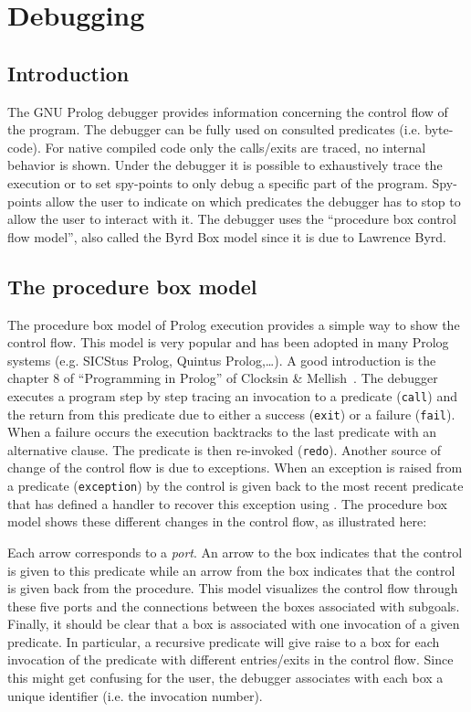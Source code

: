 \newpage
\section{Debugging}
\label{Debugging}
\subsection{Introduction}
The GNU Prolog debugger provides information concerning the control flow of
the program. The debugger can be fully used on consulted predicates (i.e.
byte-code). For native compiled code only the calls/exits are traced, no
internal behavior is shown. Under the debugger it is possible to exhaustively
trace the execution or to set spy-points to only debug a specific part of the
program. Spy-points allow the user to indicate on which predicates the
debugger has to stop to allow the user to interact with it. The debugger uses
the ``procedure box control flow model'', also called the Byrd Box model
since it is due to Lawrence Byrd.

\subsection{The procedure box model}
The procedure box model of Prolog execution provides a simple way to show
the control flow. This model is very popular and has been adopted in many
Prolog systems (e.g. SICStus Prolog, Quintus Prolog,\ldots). A good
introduction is the chapter 8 of ``Programming in Prolog'' of Clocksin \&
Mellish~\cite{Clock}. The debugger executes a program step by step tracing an
invocation to a predicate (\texttt{call}) and the return from this predicate
due to either a success (\texttt{exit}) or a failure (\texttt{fail}). When a
failure occurs the execution backtracks to the last predicate with an
alternative clause. The predicate is then re-invoked (\texttt{redo}).
Another source of change of the control flow is due to exceptions. When an
exception is raised from a predicate (\texttt{exception}) by
  the control is given back to the most
recent predicate that has defined a handler to recover this exception using
 . The procedure box model shows these
different changes in the control flow, as illustrated here:


Each arrow corresponds to a \emph{port}. An arrow to the box indicates
that the control is given to this predicate while an arrow from the box
indicates that the control is given back from the procedure. This model
visualizes the control flow through these five ports and the connections
between the boxes associated with subgoals. Finally, it should be clear that a
box is associated with one invocation of a given predicate. In particular, a
recursive predicate will give raise to a box for each invocation of the
predicate with different entries/exits in the control flow. Since this might
get confusing for the user, the debugger associates with each box a unique
identifier (i.e. the invocation number). 

